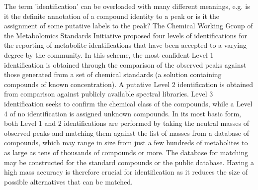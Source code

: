 The term 'identification' can be overloaded with many different meanings, e.g. is it the definite annotation of a compound identity to a peak or is it the assignment of some putative labels to the peak? The Chemical Working Group of the Metabolomics Standards Initiative proposed four levels of identifications for the reporting of metabolite identifications \cite{Sumner2007} that have been accepted to a varying degree by the community. In this scheme, the most confident Level 1 identification is obtained through the comparison of the observed peaks against those generated from a set of chemical standards (a solution containing compounds of known concentration). A putative Level 2 identification is obtained from comparison against publicly available spectral libraries. Level 3 identification seeks to confirm the chemical class of the compounds, while a Level 4 of no identification is assigned unknown compounds. In its most basic form, both Level 1 and 2 identifications are performed by taking the neutral masses of observed peaks and matching them against the list of masses from a database of compounds, which may range in size from just a few hundreds of metabolites to as large as tens of thousands of compounds or more. The database for matching may be constructed for the standard compounds or the public database. Having a high mass accuracy is therefore crucial for identification as it reduces the size of possible alternatives that can be matched. 

